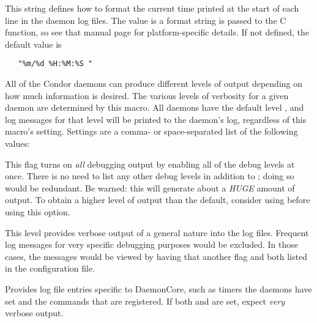 \begin{description}
\label{param:DebugTimeFormat}
\item[\Macro{DEBUG\_TIME\_FORMAT}]
  This string defines how to format the current time printed at the
  start of each line in the daemon log files.  The value is a format 
  string is passed to the C  function,
  so see that manual page for platform-specific details.
  If not defined, the default value is 
\begin{verbatim}
   "%m/%d %H:%M:%S "  
\end{verbatim}

\label{param:SubsysDebug}
\item[\MacroB{<SUBSYS>\_DEBUG}]
  All of the
  Condor daemons can produce different levels of output depending on
  how much information is desired.  The various levels of
  verbosity for a given daemon are determined by this macro.  All
  daemons have the default level , and log messages for
  that level will be printed to the daemon's log, regardless of this
  macro's setting.  Settings are a comma- or space-separated list
  of the following values:

  \begin{description}
    \label{list:debug-level-description}

  \label{dflag:all}
  \item[\Dflag{ALL}]
    This flag turns on \emph{all} debugging output by enabling all of the debug
    levels at once.  There is no need to list any other debug levels in addition
    to ; doing so would be redundant.  Be warned: this will
    generate
    about a \emph{HUGE} amount of output.
    To obtain a higher
    level of output than the default, consider using  before
    using this option.

  \label{dflag:fulldebug}
  \item[\Dflag{FULLDEBUG}]
    This level
    provides verbose output of a general nature into the log files.  
    Frequent log messages for very specific debugging
    purposes would be excluded. In those cases, the messages would
    be viewed by having that another flag and  both
    listed in the configuration file.

  \label{dflag:daemoncore} 
  \item[\Dflag{DAEMONCORE}]
    Provides log
    file entries specific to DaemonCore, such as
    timers the daemons have set and the commands that are registered.
    If both  and  are set,
    expect \emph{very} verbose output.


\end{description}
\end{description}
